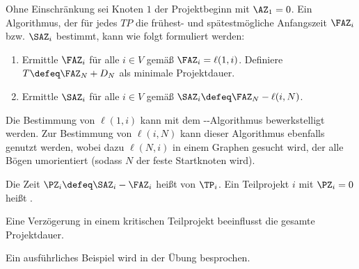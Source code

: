 Ohne Einschränkung sei Knoten $1$ der Projektbeginn mit $\AZ_1 = 0$. Ein Algorithmus, der für jedes $TP$ die frühest- und spätestmögliche Anfangszeit $\FAZ_i$ bzw. $\SAZ_i$ bestimmt, kann wie folgt formuliert werden:

\begin{enumerate}[label=Schritt \arabic*:, leftmargin=*, start=1]
	\item Ermittle $\FAZ_i$ für alle $i \in V$ gemäß $\FAZ_i = \ell(1,i)$. Definiere $T \defeq \FAZ_N + D_N$ als minimale Projektdauer.
	\item Ermittle $\SAZ_i$ für alle $i \in V$ gemäß $\SAZ_i \defeq \FAZ_N - \ell(i,N)$.
\end{enumerate}

Die Bestimmung von $\ell(1,i)$ kann mit dem --Algorithmus bewerkstelligt werden. Zur Bestimmung von $\ell(i,N)$ kann dieser Algorithmus ebenfalls genutzt werden, wobei dazu $\ell(N,i)$ in einem Graphen gesucht wird, der alle Bögen umorientiert (sodass $N$ der feste Startknoten wird).

\begin{definition}
	Die Zeit $\PZ_i \defeq \SAZ_i - \FAZ_i$ heißt  von $\TP_i$. Ein Teilprojekt $i$ mit $\PZ_i = 0$ heißt .
\end{definition}

Eine Verzögerung in einem kritischen Teilprojekt beeinflusst die gesamte Projektdauer.

Ein ausführliches Beispiel wird in der Übung besprochen.
